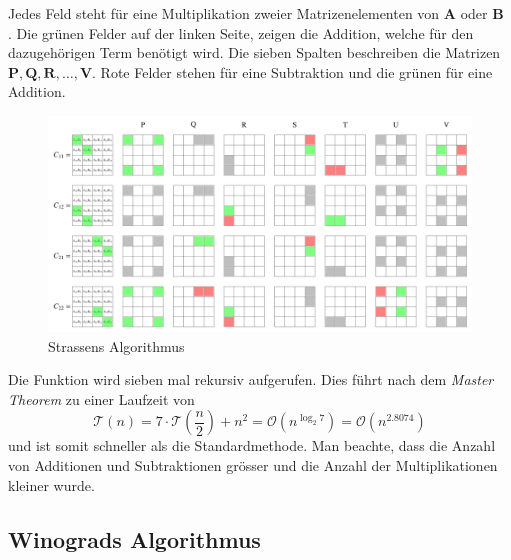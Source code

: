 Jedes Feld steht f\"ur eine Multiplikation zweier Matrizenelementen von $\mathbf{A}$ oder $\mathbf{B}$ .
Die gr\"unen Felder auf der linken Seite, zeigen die Addition, welche f\"ur den dazugeh\"origen Term ben\"otigt wird.
Die sieben Spalten beschreiben die Matrizen $\mathbf{P,Q,R, \ldots, V}$.
Rote Felder stehen f\"ur eine Subtraktion und die gr\"unen f\"ur eine Addition.
\begin{figure}
	\center
	\includegraphics[width=\linewidth]{papers/multiplikation/images/strassen.pdf}
	\caption{Strassens Algorithmus}
	\label{multiplikation:fig:strassen}
\end{figure}

Die Funktion wird sieben mal rekursiv aufgerufen.
Dies f\"uhrt nach dem \textit{Master Theorem} zu einer Laufzeit von
\begin{equation} \label{multiplikation:eq:laufzeitstrassen}
\mathcal{T}(n) =
7 \cdot \mathcal{T}\left(\frac{n}{2}\right) + n^2  = \mathcal{O}(n^{\log_2 7} ) = \mathcal{O}(n^{2.8074}  )
\end{equation}
und ist somit schneller als die Standardmethode.
Man beachte, dass die Anzahl von Additionen und Subtraktionen gr\"osser und die Anzahl der Multiplikationen kleiner wurde.

\subsection{Winograds Algorithmus}

